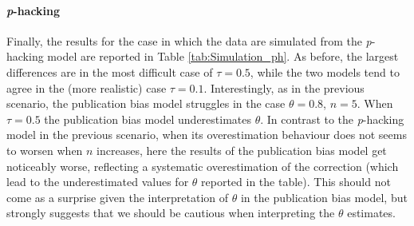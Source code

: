 \documentclass[preprint, authoryear]{elsarticle}
\theoremstyle{plain}
\theoremstyle{definition}
\begin{document}
\paragraph{\emph{p}-hacking} Finally, the results for the case in which the data are simulated from the \emph{p}-hacking model are reported in Table \ref{tab:Simulation_ph}. As before, the largest differences are in the most difficult case of $\tau = 0.5$, while the two models tend to agree in the (more realistic) case $\tau = 0.1$. Interestingly, as in the previous scenario, the publication bias model struggles in the case $\theta = 0.8$, $n=5$. When $\tau = 0.5$ the publication bias model underestimates $\theta$. In contrast to the \emph{p}-hacking model in the previous scenario, when its overestimation behaviour does not seems to worsen when $n$ increases, here the results of the publication bias model get noticeably worse, reflecting a systematic overestimation of the correction (which lead to the underestimated values for $\theta$ reported in the table). This should not come as a surprise given the interpretation of $\theta$ in the publication bias model, but strongly suggests that we should be cautious when interpreting the $\theta$ estimates. 
\end{document}
